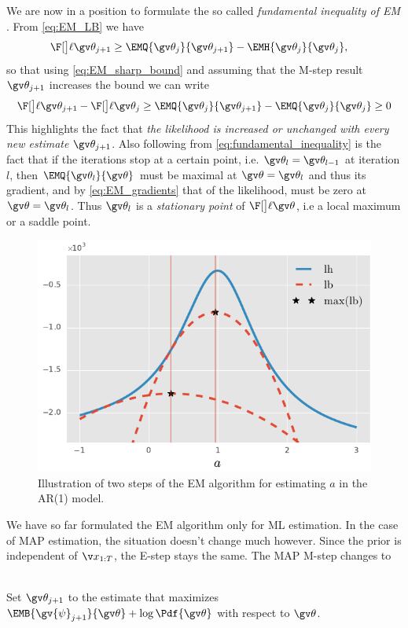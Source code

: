 We are now in a position to formulate the so called \emph{fundamental inequality of EM} \parencite{Cappe2005}.
From \eqref{eq:EM_LB} we have
\begin{align*}
	\lLH[\Th_{j+1}] & \geq \EMQ{\Th_j}{\Th_{j+1}} - \EMH{\Th_j}{\Th_{j}},
\end{align*}
so that using \eqref{eq:EM_sharp_bound} and assuming that the M-step result $\Th_{j+1}$ increases
the bound we can write
\begin{align}
\label{eq:fundamental_inequality}	
\begin{split}	
	\lLH[\Th_{j+1}] - \lLH[\Th_j] & \geq \EMQ{\Th_j}{\Th_{j+1}} - \EMQ{\Th_j}{\Th_{j}} \geq 0\\
\end{split}
\end{align}
This highlights
the fact that \emph{the likelihood is increased or unchanged with every new estimate} $\Th_{j+1}$.
Also following from \eqref{eq:fundamental_inequality} is the fact that if the iterations
stop at a certain point, i.e. $\Th_{l}=\Th_{l-1}$ at iteration $l$, then
$\EMQ{\Th_l}{\Th}$ must be maximal at $\Th=\Th_l$ and thus its gradient, and 
by \eqref{eq:EM_gradients} that of the likelihood, must be zero at $\Th=\Th_l$. Thus
$\Th_l$ is a \emph{stationary point} of $\lLH$, i.e a local maximum or a saddle point.


\begin{figure}[htb]%
    \centering%
  	\includegraphics{img/ar1_ex_em}%
	\caption{%
   	Illustration of two steps of the EM algorithm for estimating $a$
   	in the AR(1) model.
   	}
	\label{fig:ar1_em}
 \end{figure}

We have so far formulated the EM algorithm only for ML estimation. In the case
of MAP estimation, the situation doesn't change much however. Since the prior
is independent of $\X$, the E-step stays the same. The MAP M-step changes to
\begin{description}
\addtolength{\leftskip}{1cm}
  \item[M-step (MAP)]\hfill\\ 
  Set $\Th_{j+1}$ to the estimate that maximizes $\EMB{\gv{\psi}_{j+1}}{\Th}+\log\Pdf{\Th}$ with respect to $\Th$.
\end{description}%


